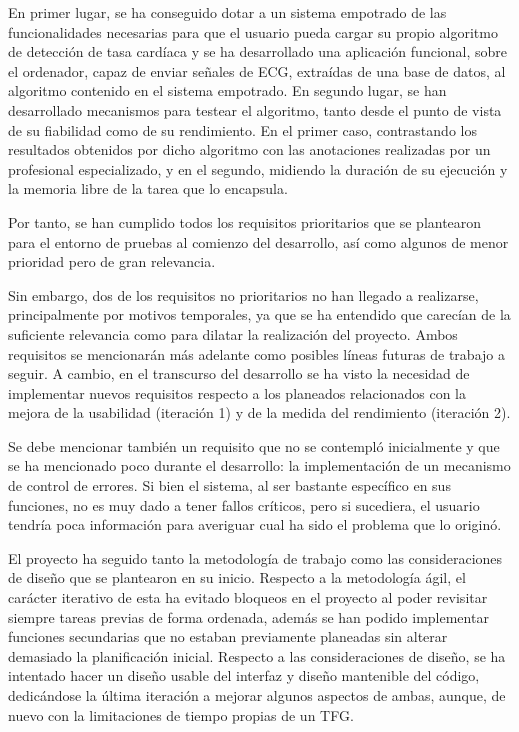 En primer lugar, se ha conseguido dotar a un sistema empotrado de las funcionalidades necesarias para que el usuario pueda cargar su propio algoritmo de detección de tasa cardíaca y se ha desarrollado una aplicación funcional, sobre el ordenador, capaz de enviar señales de ECG, extraídas de una base de datos, al algoritmo contenido en el sistema empotrado. En segundo lugar, se han desarrollado  mecanismos para testear el algoritmo, tanto desde el punto de vista de su fiabilidad como de su rendimiento. En el primer caso, contrastando los resultados obtenidos por dicho algoritmo con las anotaciones realizadas por un profesional especializado, y en el segundo, midiendo la duración de su ejecución y la memoria libre de la tarea que lo encapsula. 

Por tanto, se han cumplido todos los requisitos prioritarios que se plantearon para el entorno de pruebas al comienzo del desarrollo, así como algunos de menor prioridad pero de gran relevancia. 

Sin embargo, dos de los requisitos no prioritarios no han llegado a realizarse, principalmente por motivos temporales, ya que se ha entendido que carecían de la suficiente relevancia como para dilatar la realización del proyecto. Ambos requisitos se mencionarán más adelante como posibles líneas futuras de trabajo a seguir. A cambio, en el transcurso del desarrollo se ha visto la necesidad de implementar nuevos requisitos respecto a los planeados relacionados con la mejora de la usabilidad (iteración 1) y de la medida del rendimiento (iteración 2). 

Se debe mencionar también un requisito que no se contempló inicialmente y que se ha mencionado poco durante el desarrollo: la implementación de un mecanismo de control de errores. Si bien el sistema, al ser bastante específico en sus funciones, no es muy dado a tener fallos críticos, pero si sucediera, el usuario tendría poca información para averiguar cual ha sido el problema que lo originó.
 
El proyecto ha seguido tanto la metodología de trabajo como las consideraciones de diseño que se plantearon en su inicio. Respecto a la metodología ágil, el carácter iterativo de esta ha evitado bloqueos en el proyecto al poder revisitar siempre tareas previas de forma ordenada, además se han podido implementar funciones secundarias que no estaban previamente planeadas sin alterar demasiado la planificación inicial.  Respecto a las consideraciones de diseño, se ha intentado hacer un diseño usable del interfaz y diseño mantenible del código, dedicándose la última iteración a mejorar algunos aspectos de ambas, aunque, de nuevo con la limitaciones de tiempo propias de un TFG. 

